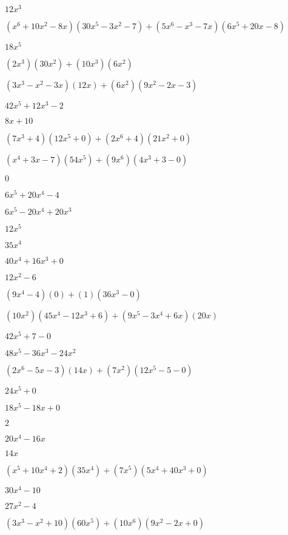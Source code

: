 \documentclass{article}
\begin{document}
\begin{multicols}{2}
$12x^{3}$\item $(x^{6}+10x^2-8x)(30x^{5}-3x^{2}-7)+(5x^{6}-x^{3}-7x)(6x^{5}+20x-8)$\item $18x^{5}$\item $(2x^{3})(30x^{2})+(10x^{3})(6x^{2})$\item $(3x^{3}-x^2-3x)(12x)+(6x^2)(9x^{2}-2x-3)$\item $42x^{5}+12x^{3}-2$\item $8x+10$\item $(7x^{3}+4)(12x^{5}+0)+(2x^{6}+4)(21x^{2}+0)$\item $(x^{4}+3x-7)(54x^{5})+(9x^{6})(4x^{3}+3-0)$\item $0$\item $6x^{5}+20x^{4}-4$\item $6x^{5}-20x^{4}+20x^{3}$\item $12x^{5}$\item $35x^{4}$\item $40x^{4}+16x^{3}+0$\item $12x^{2}-6$\item $(9x^{4}-4)(0)+(1)(36x^{3}-0)$\item $(10x^2)(45x^{4}-12x^{3}+6)+(9x^{5}-3x^{4}+6x)(20x)$\item $42x^{5}+7-0$\item $48x^{5}-36x^{3}-24x^{2}$\item $(2x^{6}-5x-3)(14x)+(7x^2)(12x^{5}-5-0)$\item $24x^{5}+0$\item $18x^{5}-18x+0$\item $2$\item $20x^{4}-16x$\item $14x$\item $(x^{5}+10x^{4}+2)(35x^{4})+(7x^{5})(5x^{4}+40x^{3}+0)$\item $30x^{4}-10$\item $27x^{2}-4$\item $(3x^{3}-x^2+10)(60x^{5})+(10x^{6})(9x^{2}-2x+0)$\item 
\end{multicols}
\end{document}
